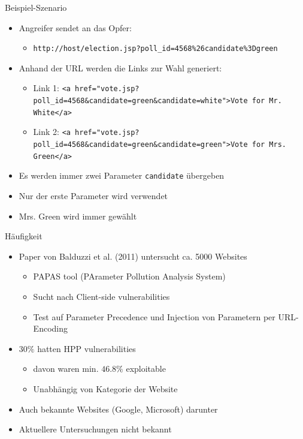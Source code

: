 \documentclass[t,german,aspectratio=169]{beamer}
\begin{document}
\begin{frame}{Beispiel-Szenario}
\begin{itemize}%
	\item Angreifer sendet an das Opfer:
	\begin{itemize}
		\item \texttt{http://host/election.jsp?\textcolor{red!70!black}{poll\_id=4568}\textcolor{green!70!black}{\%26candidate\%3Dgreen}}
	\end{itemize}
	\item Anhand der URL werden die Links zur Wahl generiert:
	\begin{itemize} 
		\item Link 1: \texttt{<a href="vote.jsp?\textcolor{red!70!black}{poll\_id=4568}\&\textcolor{green!70!black}{candidate=green}\&\textcolor{blue!70!black}{candidate=white}">Vote for Mr. White</a>}
		\item Link 2: \texttt{<a href="vote.jsp?\textcolor{red!70!black}{poll\_id=4568}\&\textcolor{green!70!black}{candidate=green}\&\textcolor{blue!70!black}{candidate=green}">Vote for Mrs. Green</a>}
	\end{itemize}
	\item Es werden immer zwei Parameter \texttt{candidate} übergeben
	\item Nur der erste Parameter wird verwendet
	\item Mrs. Green wird immer gewählt
\end{itemize}
\end{frame}

\begin{frame}{Häufigkeit}
\begin{itemize}[<+->]
	\item Paper von Balduzzi et al. (2011) untersucht ca. 5000 Websites
	\begin{itemize}
		\item PAPAS tool (PArameter Pollution Analysis System)
		\item Sucht nach Client-side vulnerabilities
		\item Test auf Parameter Precedence und Injection von Parametern per URL-Encoding
	\end{itemize}
	\item $30\%$ hatten HPP vulnerabilities
	\begin{itemize}
		\item davon waren min. $46.8\%$ exploitable
		\item Unabhängig von Kategorie der Website
	\end{itemize}
	\item Auch bekannte Websites (Google, Microsoft) darunter
	\item Aktuellere Untersuchungen nicht bekannt
\end{itemize}
\end{frame}
\end{document}
